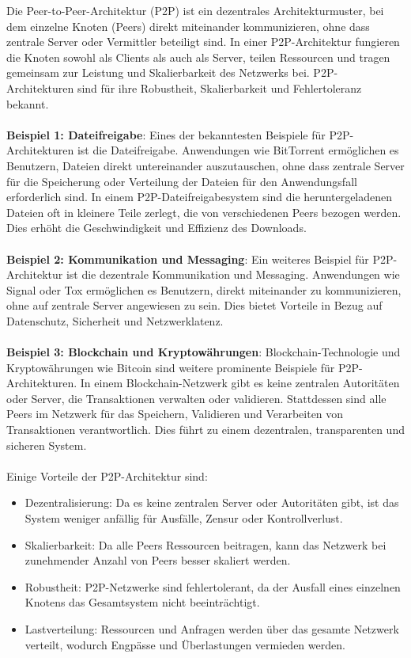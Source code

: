 Die Peer-to-Peer-Architektur (P2P) ist ein dezentrales Architekturmuster, bei dem einzelne Knoten (Peers) direkt miteinander kommunizieren, ohne dass zentrale Server oder Vermittler beteiligt sind. In einer P2P-Architektur fungieren die Knoten sowohl als Clients als auch als Server, teilen Ressourcen und tragen gemeinsam zur Leistung und Skalierbarkeit des Netzwerks bei. P2P-Architekturen sind für ihre Robustheit, Skalierbarkeit und Fehlertoleranz bekannt.
\\\\
\textbf{Beispiel 1: Dateifreigabe}: Eines der bekanntesten Beispiele für P2P-Architekturen ist die Dateifreigabe. Anwendungen wie BitTorrent ermöglichen es Benutzern, Dateien direkt untereinander auszutauschen, ohne dass zentrale Server für die Speicherung oder Verteilung der Dateien für den Anwendungsfall erforderlich sind. In einem P2P-Dateifreigabesystem sind die heruntergeladenen Dateien oft in kleinere Teile zerlegt, die von verschiedenen Peers bezogen werden. Dies erhöht die Geschwindigkeit und Effizienz des Downloads.
\\\\
\textbf{Beispiel 2: Kommunikation und Messaging}: Ein weiteres Beispiel für P2P-Architektur ist die dezentrale Kommunikation und Messaging. Anwendungen wie Signal oder Tox ermöglichen es Benutzern, direkt miteinander zu kommunizieren, ohne auf zentrale Server angewiesen zu sein. Dies bietet Vorteile in Bezug auf Datenschutz, Sicherheit und Netzwerklatenz.
\\\\
\textbf{Beispiel 3: Blockchain und Kryptowährungen}: Blockchain-Technologie und Kryptowährungen wie Bitcoin sind weitere prominente Beispiele für P2P-Architekturen. In einem Blockchain-Netzwerk gibt es keine zentralen Autoritäten oder Server, die Transaktionen verwalten oder validieren. Stattdessen sind alle Peers im Netzwerk für das Speichern, Validieren und Verarbeiten von Transaktionen verantwortlich. Dies führt zu einem dezentralen, transparenten und sicheren System.
\\\\
Einige Vorteile der P2P-Architektur sind:
\begin{itemize}
\item Dezentralisierung: Da es keine zentralen Server oder Autoritäten gibt, ist das System weniger anfällig für Ausfälle, Zensur oder Kontrollverlust.
\item Skalierbarkeit: Da alle Peers Ressourcen beitragen, kann das Netzwerk bei zunehmender Anzahl von Peers besser skaliert werden.
\item Robustheit: P2P-Netzwerke sind fehlertolerant, da der Ausfall eines einzelnen Knotens das Gesamtsystem nicht beeinträchtigt.
\item Lastverteilung: Ressourcen und Anfragen werden über das gesamte Netzwerk verteilt, wodurch Engpässe und Überlastungen vermieden werden.
\end{itemize}


